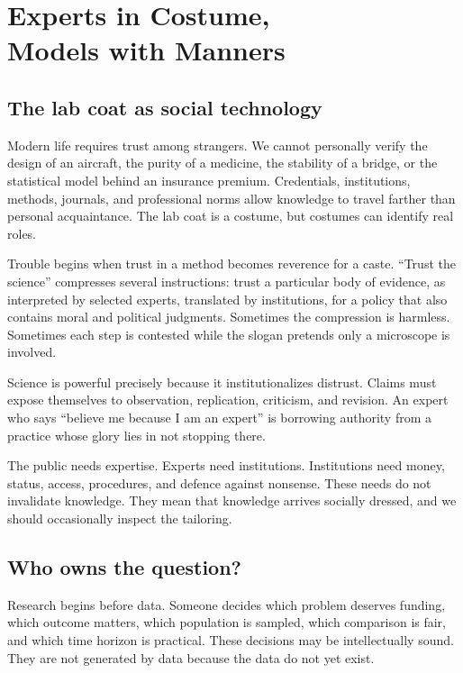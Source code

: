 \documentclass[12pt,a4paper]{book}
\begin{document}
\chapter[Experts in Costume, Models with Manners]{Experts in Costume,\\Models with Manners}
\label{chap:experts-models}

\section{The lab coat as social technology}

Modern life requires trust among strangers.  We cannot personally verify the
design of an aircraft, the purity of a medicine, the stability of a bridge, or
the statistical model behind an insurance premium.  Credentials, institutions,
methods, journals, and professional norms allow knowledge to travel farther
than personal acquaintance.  The lab coat is a costume, but costumes can
identify real roles.

Trouble begins when trust in a method becomes reverence for a caste.  ``Trust
the science'' compresses several instructions: trust a particular body of
evidence, as interpreted by selected experts, translated by institutions, for
a policy that also contains moral and political judgments.  Sometimes the
compression is harmless.  Sometimes each step is contested while the slogan
pretends only a microscope is involved.

Science is powerful precisely because it institutionalizes distrust.  Claims
must expose themselves to observation, replication, criticism, and revision.
An expert who says ``believe me because I am an expert'' is borrowing authority
from a practice whose glory lies in not stopping there.

The public needs expertise.  Experts need institutions.  Institutions need
money, status, access, procedures, and defence against nonsense.  These needs
do not invalidate knowledge.  They mean that knowledge arrives socially
dressed, and we should occasionally inspect the tailoring.

\section{Who owns the question?}

Research begins before data.  Someone decides which problem deserves funding,
which outcome matters, which population is sampled, which comparison is fair,
and which time horizon is practical.  These decisions may be intellectually
sound.  They are not generated by data because the data do not yet exist.
\end{document}
